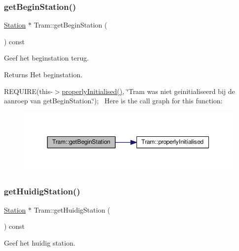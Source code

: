 \subsubsection{\texorpdfstring{get\+Begin\+Station()}{getBeginStation()}}
{\footnotesize\ttfamily \hyperlink{class_station}{Station} $\ast$ Tram\+::get\+Begin\+Station (\begin{DoxyParamCaption}{ }\end{DoxyParamCaption}) const}



Geef het beginstation terug. 

\begin{DoxyReturn}{Returns}
Het beginstation.
\end{DoxyReturn}
R\+E\+Q\+U\+I\+RE(this-\/$>$\hyperlink{class_tram_ac2688f590e4db232b4f535c9bf959efb}{properly\+Initialised()}, \char`\"{}\+Tram was niet geinitialiseerd bij de aanroep van get\+Begin\+Station.\char`\"{});~\newline
Here is the call graph for this function\+:\nopagebreak
\begin{figure}[H]
\begin{center}
\leavevmode
\includegraphics[width=350pt]{class_tram_abe386592de6a7930df75ea184b945403_cgraph}
\end{center}
\end{figure}
\mbox{\label{class_tram_ad04f5905ffec6ef4069b27f08c63f4b9}} 
\subsubsection{\texorpdfstring{get\+Huidig\+Station()}{getHuidigStation()}}
{\footnotesize\ttfamily \hyperlink{class_station}{Station} $\ast$ Tram\+::get\+Huidig\+Station (\begin{DoxyParamCaption}{ }\end{DoxyParamCaption}) const}



Geef het huidig station. 

